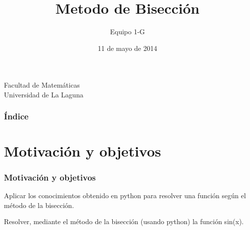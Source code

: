 \documentclass{beamer}
\title[Método de Bisección]{Metodo de Bisección}
\author[Equipo 1 G]{Equipo 1-G}
\date[11-05-2014]{11 de mayo de 2014}
\begin{document}
  

\begin{frame}

  \begin{small}
    \begin{center}
     Facultad de Matemáticas \\
     Universidad de La Laguna
    \end{center}
  \end{small}

\end{frame}

\begin{frame}
  \frametitle{Índice}  
  \tableofcontents[pausesections]
\end{frame}


\section{Motivación y objetivos}
\begin{frame}

\frametitle{Motivación y objetivos}
\begin{Motivation}
    Aplicar los conocimientos obtenido en python para resolver una función según el método de la bisección.
\end{Motivation}

\begin{Objetivos}
     Resolver, mediante el método de la bisección (usando python) la función sin(x).
\end{Objetivos}

\end{frame}
\end{document}
